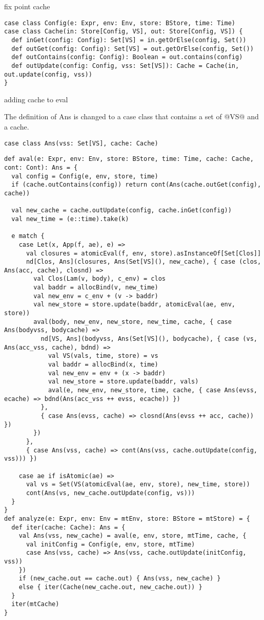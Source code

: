 \documentclass[acmsmall,review,anonymous]{acmart}\settopmatter{printfolios=true,printccs=false,printacmref=false}
\begin{document}
fix point cache

\begin{lstlisting}
case class Config(e: Expr, env: Env, store: BStore, time: Time)
case class Cache(in: Store[Config, VS], out: Store[Config, VS]) {
  def inGet(config: Config): Set[VS] = in.getOrElse(config, Set())
  def outGet(config: Config): Set[VS] = out.getOrElse(config, Set())
  def outContains(config: Config): Boolean = out.contains(config)
  def outUpdate(config: Config, vss: Set[VS]): Cache = Cache(in, out.update(config, vss))
}
\end{lstlisting}

adding cache to eval

The definition of Ans is changed to a case class that contains a set of @VS@ and
a cache.
\begin{lstlisting}
case class Ans(vss: Set[VS], cache: Cache)
\end{lstlisting}

\begin{lstlisting}
def aval(e: Expr, env: Env, store: BStore, time: Time, cache: Cache, cont: Cont): Ans = {
  val config = Config(e, env, store, time)
  if (cache.outContains(config)) return cont(Ans(cache.outGet(config), cache))

  val new_cache = cache.outUpdate(config, cache.inGet(config))
  val new_time = (e::time).take(k)

  e match {
    case Let(x, App(f, ae), e) =>
      val closures = atomicEval(f, env, store).asInstanceOf[Set[Clos]]
      nd[Clos, Ans](closures, Ans(Set[VS](), new_cache), { case (clos, Ans(acc, cache), closnd) =>
        val Clos(Lam(v, body), c_env) = clos
        val baddr = allocBind(v, new_time)
        val new_env = c_env + (v -> baddr)
        val new_store = store.update(baddr, atomicEval(ae, env, store))
        aval(body, new_env, new_store, new_time, cache, { case Ans(bodyvss, bodycache) =>
          nd[VS, Ans](bodyvss, Ans(Set[VS](), bodycache), { case (vs, Ans(acc_vss, cache), bdnd) =>
            val VS(vals, time, store) = vs
            val baddr = allocBind(x, time)
            val new_env = env + (x -> baddr)
            val new_store = store.update(baddr, vals)
            aval(e, new_env, new_store, time, cache, { case Ans(evss, ecache) => bdnd(Ans(acc_vss ++ evss, ecache)) })
          },
          { case Ans(evss, cache) => closnd(Ans(evss ++ acc, cache)) })
        })
      },
      { case Ans(vss, cache) => cont(Ans(vss, cache.outUpdate(config, vss))) })

    case ae if isAtomic(ae) =>
      val vs = Set(VS(atomicEval(ae, env, store), new_time, store))
      cont(Ans(vs, new_cache.outUpdate(config, vs)))
  }
}
def analyze(e: Expr, env: Env = mtEnv, store: BStore = mtStore) = {
  def iter(cache: Cache): Ans = {
    val Ans(vss, new_cache) = aval(e, env, store, mtTime, cache, { 
      val initConfig = Config(e, env, store, mtTime)
      case Ans(vss, cache) => Ans(vss, cache.outUpdate(initConfig, vss)) 
    })
    if (new_cache.out == cache.out) { Ans(vss, new_cache) }
    else { iter(Cache(new_cache.out, new_cache.out)) }
  }    
  iter(mtCache)
}
\end{lstlisting}
\end{document}
